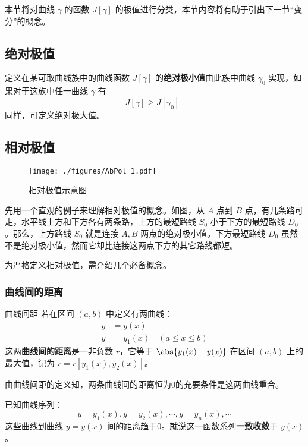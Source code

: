 

本节将对曲线 $\gamma$ 的函数 $J[\gamma]$ 的极值进行分类，本节内容将有助于引出下一节“变分”的概念。

\subsection{绝对极值}
定义在某可取曲线族中的曲线函数 $J[\gamma]$ 的\textbf{绝对极小值}由此族中曲线 $\gamma_0$ 实现，如果对于这族中任一曲线 $\gamma$ 有
\begin{equation}
J[\gamma]\geq J[\gamma_0]~.
\end{equation}
同样，可定义绝对极大值。
\subsection{相对极值}\label{AbPol_sub1}
\begin{figure}[ht]
\centering
\texttt{[image: ./figures/AbPol\_1.pdf]}
\caption{相对极值示意图} \label{AbPol_fig1}
\end{figure}

先用一个直观的例子来理解相对极值的概念。如图，从 $A$ 点到 $B$ 点，有几条路可走，水平线上方和下方各有两条路，上方的最短路线 $S_0$ 小于下方的最短路线 $D_0$ 。那么，上方路线 $S_0$ 就是连接 $A,B$ 两点的绝对极小值。下方最短路线 $D_0$ 虽然不是绝对极小值，然而它却比连接这两点下方的其它路线都短。 

为严格定义相对极值，需介绍几个必备概念。
\subsubsection{曲线间的距离}
\begin{definition}{曲线间距}
若在区间 $(a,b)$ 中定义有两曲线：
\begin{equation}
\begin{aligned}
y&=y(x)\\
y&=y_1(x)\quad(a\leq x\leq b)
\end{aligned}
\end{equation}
这两\textbf{曲线间的距离}是一非负数 $r$，它等于 $\abs{y_1(x)-y(x)}$ 在区间 $(a,b)$ 上的最大值，记为 $r=r[y_1(x),y_2(x)]$。
\end{definition}
由曲线间距的定义知，两条曲线间的距离恒为0的充要条件是这两曲线重合。

已知曲线序列：
\begin{equation}
y=y_1(x),y=y_2(x),\cdots,y=y_n(x),\cdots
\end{equation}
这些曲线到曲线 $y=y(x)$ 间的距离趋于0。就说这一函数系列\textbf{一致收敛}于 $y(x)$。

